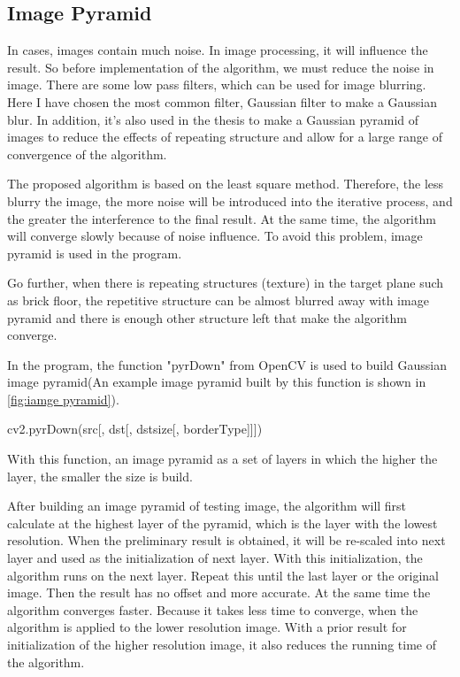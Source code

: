 \subsection{Image Pyramid}
In cases, images contain much noise. In image processing, it will influence the result. So before implementation of the algorithm, we must reduce the noise in image. There are some low pass filters, which can be used for image blurring. Here I have chosen the most common filter, Gaussian filter to make a Gaussian blur. In addition, it's also used in the thesis to make a Gaussian pyramid of images to reduce the effects of repeating structure and allow for a large range of convergence of the algorithm.

The proposed algorithm is based on the least square method. Therefore, the less blurry the image, the more noise will be introduced into the iterative process, and the greater the interference to the final result. At the same time, the algorithm will converge slowly because of noise influence. To avoid this problem, image pyramid is used in the program.

Go further, when there is repeating structures (texture) in the target plane such as brick floor, the repetitive structure can be almost blurred away with image pyramid and there is enough other structure left that make the algorithm converge.

In the program, the function "pyrDown" from OpenCV is used to build  Gaussian image pyramid(An example image pyramid built by this function is shown in \cref{fig:iamge pyramid}).
\begin{python}[caption={Image pyramid}, label={lst:Imagepyramid}]
	cv2.pyrDown(src[, dst[, dstsize[, borderType]]])
\end{python}
With this function, an image pyramid as a set of layers in which the higher the layer, the smaller the size is build.

After building an image pyramid of testing image, the algorithm will first calculate at the highest layer of the pyramid, which is the layer with the lowest resolution. When the preliminary result is obtained, it will be re-scaled into next layer and used as the initialization of next layer. With this initialization, the algorithm runs on the next layer. Repeat this until the last layer or the original image. Then the result has no offset and more accurate. At the same time the algorithm converges faster. Because it takes less time to converge, when the algorithm is applied to the lower resolution image. With a prior result for initialization of the higher resolution image, it also reduces the running time of the algorithm.

